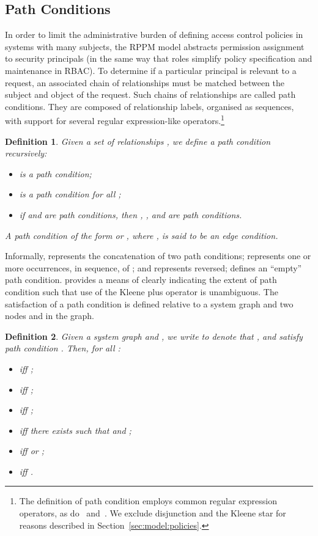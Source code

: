 \documentclass{article}
\newtheorem{definition}{Definition}
\begin{document}
\subsection{Path Conditions}\label{sec:model:path_condition}
In order to limit the administrative burden of defining access control policies in systems with many subjects, the RPPM model abstracts permission assignment to security principals (in the same way that roles simplify policy specification and maintenance in RBAC).
To determine if a particular principal is relevant to a request, an associated chain of relationships must be matched between the subject and object of the request.
Such chains of relationships are called path conditions.
They are composed of relationship labels, organised as sequences, with support for several regular expression-like operators.\footnote{The definition of path condition employs common regular expression operators, as do~\cite{ChengPS12dbsec} and~\cite{KhanF12}. We exclude disjunction and the Kleene star for reasons described in Section~\ref{sec:model:policies}.}

\begin{definition}\label{def:path-condition}Given a set of relationships , we define a \emph{path condition} recursively:
    \begin{itemize}
        \item  is a path condition;
        \item  is a path condition for all ;
        \item if  and  are path conditions, then , ,  and  are path conditions.
    \end{itemize}
   A path condition of the form  or , where , is said to be an \emph{edge condition}.
\end{definition}

Informally,  represents the concatenation of two path conditions;  represents one or more occurrences, in sequence, of ; and  represents  reversed;  defines an ``empty'' path condition.
 provides a means of clearly indicating the extent of path condition  such that use of the Kleene plus operator is unambiguous.
The satisfaction of a path condition is defined relative to a system graph  and two nodes  and  in the graph.

\begin{definition}\label{def:path-condition-satisfaction}Given a system graph  and , we write  to denote that  ,  and  \emph{satisfy path condition} .
    Then, for all :
    \begin{itemize}
        \item  iff ;
        \item  iff ;
        \item  iff ;
        \item  iff there exists  such that  and ;
        \item  iff  or ;
        \item  iff .
    \end{itemize}
\end{definition}
\end{document}
